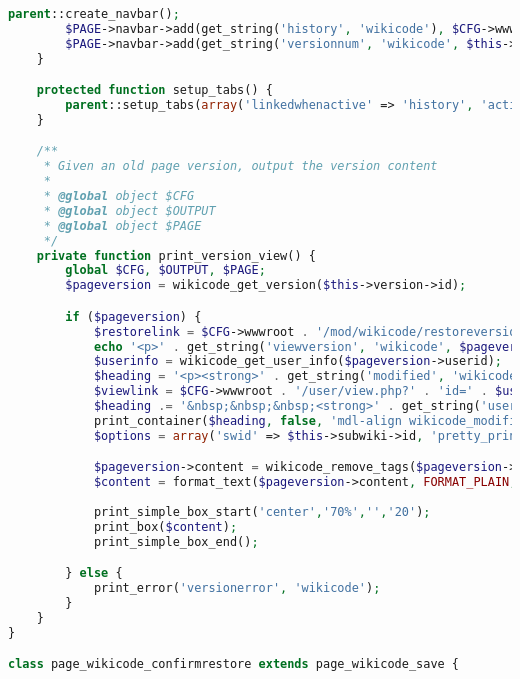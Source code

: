 \begin{lstlisting}[language=PHP]
        parent::create_navbar();
        $PAGE->navbar->add(get_string('history', 'wikicode'), $CFG->wwwroot . '/mod/wikicode/history.php?pageid' . $this->page->id);
        $PAGE->navbar->add(get_string('versionnum', 'wikicode', $this->version->version));
    }

    protected function setup_tabs() {
        parent::setup_tabs(array('linkedwhenactive' => 'history', 'activetab' => 'history', 'inactivetabs' => array('edit')));
    }

    /**
     * Given an old page version, output the version content
     *
     * @global object $CFG
     * @global object $OUTPUT
     * @global object $PAGE
     */
    private function print_version_view() {
        global $CFG, $OUTPUT, $PAGE;
        $pageversion = wikicode_get_version($this->version->id);

        if ($pageversion) {
            $restorelink = $CFG->wwwroot . '/mod/wikicode/restoreversion.php?' . 'pageid=' . $this->page->id . '&versionid=' . $this->version->id;
            echo '<p>' . get_string('viewversion', 'wikicode', $pageversion->version) . '<br />' . html_writer::link($restorelink, '(' . get_string('restorethis', 'wikicode') . ')', array('class' => 'wikicode_restore')) . '&nbsp;' . '</p>';
            $userinfo = wikicode_get_user_info($pageversion->userid);
            $heading = '<p><strong>' . get_string('modified', 'wikicode') . ':</strong>&nbsp;' . userdate($pageversion->timecreated, get_string('strftimedatetime', 'langconfig'));
            $viewlink = $CFG->wwwroot . '/user/view.php?' . 'id=' . $userinfo->id;
            $heading .= '&nbsp;&nbsp;&nbsp;<strong>' . get_string('user') . ':</strong>&nbsp;' . html_writer::link($viewlink, fullname($userinfo));
            print_container($heading, false, 'mdl-align wikicode_modifieduser wikicode_headingtime');
            $options = array('swid' => $this->subwiki->id, 'pretty_print' => true, 'pageid' => $this->page->id);

            $pageversion->content = wikicode_remove_tags($pageversion->content);
    		$content = format_text($pageversion->content, FORMAT_PLAIN, array('overflowdiv'=>true));
			
			print_simple_box_start('center','70%','','20');
            print_box($content);
			print_simple_box_end();

        } else {
            print_error('versionerror', 'wikicode');
        }
    }
}

class page_wikicode_confirmrestore extends page_wikicode_save {


\end{lstlisting}
